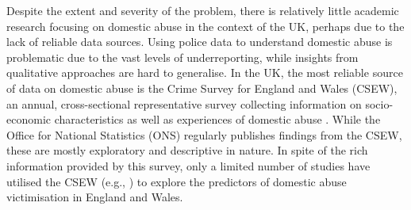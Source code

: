 \documentclass[11pt, a4paper]{article}
\begin{document}


Despite the extent and severity of the problem, there is relatively little academic research focusing on domestic abuse in the context of the UK, perhaps due to the lack of reliable data sources. Using police data to understand domestic abuse is problematic due to the vast levels of underreporting, while insights from qualitative approaches are hard to generalise. In the UK, the most reliable source of data on domestic abuse is the Crime Survey for England and Wales (CSEW), an annual, cross-sectional representative survey collecting information on socio-economic characteristics as well as experiences of domestic abuse \cite{OfficeforNationalStatistics2019}.  While the Office for National Statistics (ONS) regularly publishes findings from the CSEW, these are mostly exploratory and descriptive in nature. In spite of the rich information provided by this survey, only a limited number of studies have utilised the CSEW (e.g., ) to explore the predictors of domestic abuse victimisation in England and Wales. 

\end{document}
